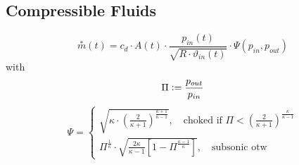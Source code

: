 \subsection{Compressible Fluids}
        \vspace{0.5em}
        $$
            \overset{*}{m}(t) = c_d \cdot A(t) \cdot \frac{p_{in}(t)}{\sqrt{R \cdot \vartheta_{in}(t)}} \cdot \Psi(p_{in},p_{out})
        $$
        with
        $$
            \Pi \vcentcolon= \frac{p_{out}}{p_{in}}
        $$
        $$
            \Psi = 
            \begin{cases}
                \sqrt{\kappa \cdot \left( \frac{2}{\kappa + 1} \right)^{\frac{\kappa + 1 }{\kappa -1}}}, \quad \textrm{choked if } \Pi < \left( \frac{2}{\kappa + 1} \right)^{\frac{\kappa}{\kappa - 1}}\\[1em]
                \Pi^{\frac{1}{\kappa}} \cdot \sqrt{\frac{2\kappa}{\kappa -1} \left[ 1 - \Pi^{\frac{\kappa-1}{\kappa}} \right]}, \quad \textrm{subsonic otw}
            \end{cases}
        $$
